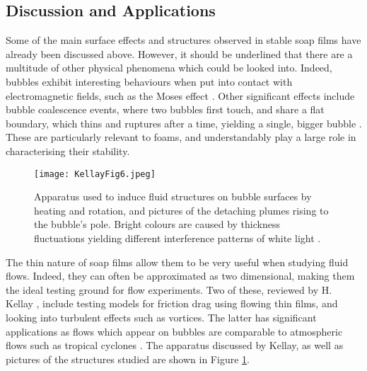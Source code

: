 \documentclass[a4paper,12pt]{article}
\numberwithin{equation}{section}
\numberwithin{figure}{section}
\numberwithin{table}{section}
\begin{document}
\subsection{Discussion and Applications}
Some of the main surface effects and structures observed in stable soap films have already been discussed above. However, it should be underlined that there are a multitude of other physical phenomena which could be looked into. Indeed, bubbles exhibit interesting behaviours when put into contact with electromagnetic fields, such as the Moses effect \cite{Wilson1925, Legchenkova2018}. Other significant effects include bubble coalescence events, where two bubbles first touch, and share a flat boundary, which thins and ruptures after a time, yielding a single, bigger bubble \cite{Pfeiffer2020}. These are particularly relevant to foams, and understandably play a large role in characterising their stability.

\begin{figure} [h]
    \centering
    \captionsetup{width=.9\linewidth}
    \texttt{[image: KellayFig6.jpeg]}
    \caption{Apparatus used to induce fluid structures on bubble surfaces by heating and rotation, and pictures of the detaching plumes rising to the bubble's pole. Bright colours are caused by thickness fluctuations yielding different interference patterns of white light \cite{Kellay2017}.}
    \label{fig:Kellay6}
\end{figure}

The thin nature of soap films allow them to be very useful when studying fluid flows. Indeed, they can often be approximated as two dimensional, making them the ideal testing ground for flow experiments. Two of these, reviewed by H. Kellay \cite{Kellay2017}, include testing models for friction drag using flowing thin films, and looking into turbulent effects such as vortices. The latter has significant applications as flows which appear on bubbles are comparable to atmospheric flows such as tropical cyclones \cite{Seychelles2008}. The apparatus discussed by Kellay, as well as pictures of the structures studied are shown in Figure \ref{fig:Kellay6}.

\newpage
\end{document}
